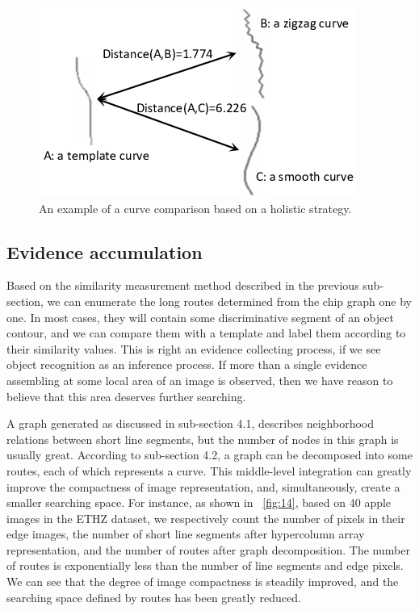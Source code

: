 \documentclass{article}
\begin{document}
\begin{figure}[!t]
\centering
\includegraphics[width=0.6\linewidth]{images/fig13.png}
\caption{An example of a curve comparison based on a holistic strategy.}
\label{fig:13}
\end{figure}

\subsection{Evidence accumulation}

Based on the similarity measurement method described in the previous sub-section, 
we can enumerate the long routes determined from the chip graph one by one. 
In most cases, they will contain some discriminative segment of an object contour, 
and we can compare them with a template and label them according to their similarity values. 
This is right an evidence collecting process, 
if we see object recognition as an inference process. 
If more than a single evidence assembling at some local area of an image is observed, 
then we have reason to believe that this area deserves further searching.

A graph generated as discussed in sub-section 4.1, 
describes neighborhood relations between short line segments, 
but the number of nodes in this graph is usually great. 
According to sub-section 4.2, a graph can be decomposed into some routes, each of which represents a curve. 
This middle-level integration can greatly improve the compactness of image representation, 
and, simultaneously, create a smaller searching space. 
For instance, as shown in \figurename~\ref{fig:14}, based on 40 apple images in the ETHZ dataset, 
we respectively count the number of pixels in their edge images, the number of short line segments after hypercolumn array representation, and the number of routes after graph decomposition. 
The number of routes is exponentially less than the number of line segments and edge pixels.
We can see that the degree of image compactness is steadily improved, 
and the searching space defined by routes has been greatly reduced. 
\end{document}
